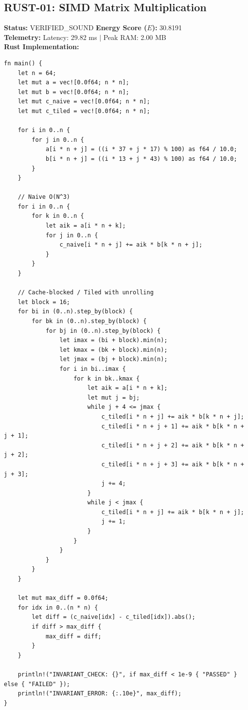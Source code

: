 \documentclass[11pt, a4paper]{article}
\begin{document}
\subsection{RUST-01: SIMD Matrix Multiplication}
\textbf{Status:} VERIFIED\_SOUND \hfill \textbf{Energy Score ($E$):} 30.8191\\
\textbf{Telemetry:} Latency: 29.82 ms $|$ Peak RAM: 2.00 MB\\
\textbf{Rust Implementation:}
\begin{verbatim}
fn main() {
    let n = 64;
    let mut a = vec![0.0f64; n * n];
    let mut b = vec![0.0f64; n * n];
    let mut c_naive = vec![0.0f64; n * n];
    let mut c_tiled = vec![0.0f64; n * n];

    for i in 0..n {
        for j in 0..n {
            a[i * n + j] = ((i * 37 + j * 17) % 100) as f64 / 10.0;
            b[i * n + j] = ((i * 13 + j * 43) % 100) as f64 / 10.0;
        }
    }

    // Naive O(N^3)
    for i in 0..n {
        for k in 0..n {
            let aik = a[i * n + k];
            for j in 0..n {
                c_naive[i * n + j] += aik * b[k * n + j];
            }
        }
    }

    // Cache-blocked / Tiled with unrolling
    let block = 16;
    for bi in (0..n).step_by(block) {
        for bk in (0..n).step_by(block) {
            for bj in (0..n).step_by(block) {
                let imax = (bi + block).min(n);
                let kmax = (bk + block).min(n);
                let jmax = (bj + block).min(n);
                for i in bi..imax {
                    for k in bk..kmax {
                        let aik = a[i * n + k];
                        let mut j = bj;
                        while j + 4 <= jmax {
                            c_tiled[i * n + j] += aik * b[k * n + j];
                            c_tiled[i * n + j + 1] += aik * b[k * n + j + 1];
                            c_tiled[i * n + j + 2] += aik * b[k * n + j + 2];
                            c_tiled[i * n + j + 3] += aik * b[k * n + j + 3];
                            j += 4;
                        }
                        while j < jmax {
                            c_tiled[i * n + j] += aik * b[k * n + j];
                            j += 1;
                        }
                    }
                }
            }
        }
    }

    let mut max_diff = 0.0f64;
    for idx in 0..(n * n) {
        let diff = (c_naive[idx] - c_tiled[idx]).abs();
        if diff > max_diff {
            max_diff = diff;
        }
    }

    println!("INVARIANT_CHECK: {}", if max_diff < 1e-9 { "PASSED" } else { "FAILED" });
    println!("INVARIANT_ERROR: {:.10e}", max_diff);
}
\end{verbatim}
\end{document}
